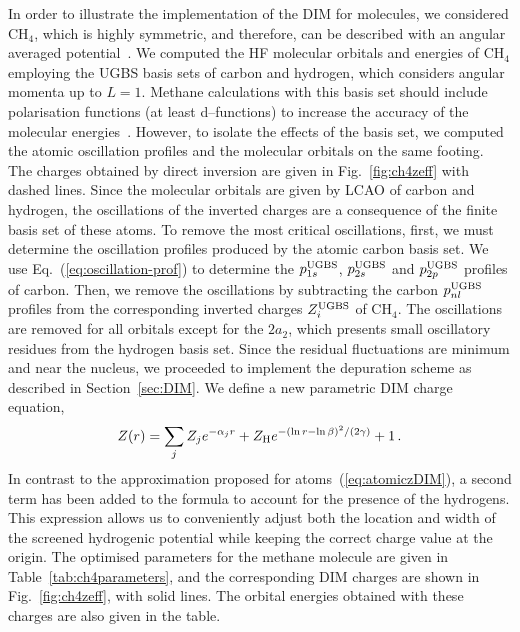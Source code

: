 \documentclass[10pt]{article}
\begin{document}
In order to illustrate the implementation of the DIM for molecules, 
we considered CH$_4$, which is highly symmetric, and therefore, can 
be described with an angular averaged potential~\cite{Granados2016}. 
We computed the HF molecular orbitals and energies of CH$_4$ 
employing the UGBS basis sets of carbon and hydrogen, which considers 
angular momenta up to $L=1$. Methane calculations with this basis set 
should include polarisation functions (at least d--functions) to 
increase the accuracy of the molecular 
energies~\cite{Rothenberg1971,Hariharan1972}. However, to isolate the 
effects of the basis set, we computed the atomic oscillation profiles 
and the molecular orbitals on the same footing. The charges obtained 
by direct inversion are given in Fig.~\ref{fig:ch4zeff} with dashed 
lines. Since the molecular orbitals are given by LCAO of carbon and 
hydrogen, the oscillations of the inverted charges are a consequence 
of the finite basis set of these atoms. To remove the most critical 
oscillations,  first, we must determine the oscillation profiles 
produced by the atomic carbon basis set. We use 
Eq.~(\ref{eq:oscillation-prof}) to determine the 
$p_{1s}^{\mbox{\scriptsize UGBS}}$, $p_{2s}^{\mbox{\scriptsize UGBS}}$ 
and $p_{2p}^{\mbox{\scriptsize UGBS}}$ profiles of carbon. Then, we 
remove the oscillations by subtracting the carbon 
$p_{nl}^{\mbox{\scriptsize UGBS}}$ profiles from the corresponding 
inverted charges $Z_{i}^{\mbox{\scriptsize UGBS}}$ of CH$_4$. The 
oscillations are removed for all orbitals except for the $2a_2$, 
which presents small oscillatory residues from the hydrogen basis 
set. Since the residual fluctuations are minimum and near the 
nucleus, we proceeded to implement the depuration scheme as described 
in Section~\ref{sec:DIM}. We define a new parametric DIM charge 
equation,
\begin{eqnarray}
 Z(r) = \sum_j Z_j e^{-\alpha_j r} 
 + Z_{\mbox{\scriptsize H}} e^{-(\ln r - \ln \beta)^2/(2\gamma)} 
 + 1\,.
 \label{eq:moleculezDIM}
\end{eqnarray}
In contrast to the approximation proposed for 
atoms~(\ref{eq:atomiczDIM}), a second term has been added to the 
formula to account for the presence of the hydrogens. This expression 
allows us to conveniently adjust both the location and width of the 
screened hydrogenic potential while keeping the correct charge value 
at the origin. 
The optimised parameters for the methane molecule are given in 
Table~\ref{tab:ch4parameters}, and the corresponding DIM charges are 
shown in Fig.~\ref{fig:ch4zeff}, with solid lines. The orbital 
energies obtained with these charges are also given in the table.
\end{document}
